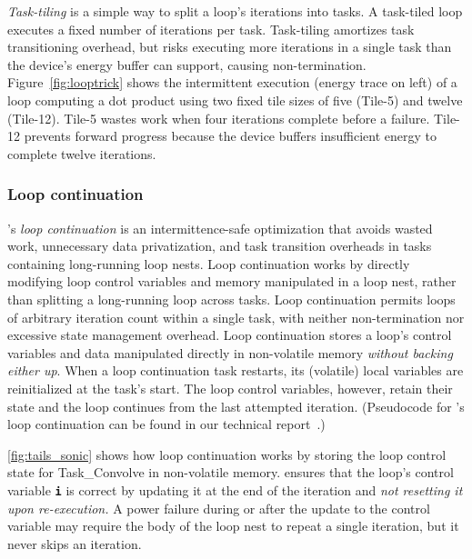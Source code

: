 \figCompDesigns

{\em Task-tiling} is a simple way to split a loop's iterations into tasks.  A
task-tiled loop executes a fixed number of iterations per task.  Task-tiling
amortizes task transitioning overhead, but risks executing more iterations in a
single task than the device's energy buffer can support, causing
non-termination.  Figure~\ref{fig:looptrick} shows the intermittent execution
(energy trace on left) of a loop computing a dot product using two
fixed tile sizes of five (Tile-5) and twelve (Tile-12). Tile-5 wastes work when four
iterations complete before a failure.  Tile-12 prevents forward
progress because the device buffers insufficient energy to complete twelve
iterations.

\subsubsection{Loop continuation}

\sonic's \emph{loop continuation} is an intermittence-safe optimization that avoids wasted work,
unnecessary data privatization, and task transition overheads in tasks
containing long-running loop nests. Loop continuation works by directly
modifying loop control variables and memory manipulated in a loop nest, rather
than splitting a long-running loop across tasks. 
%
Loop continuation
permits loops of arbitrary iteration count within a single task, with neither
non-termination nor excessive state management overhead.
%
Loop continuation stores a loop's control variables and data manipulated directly in non-volatile
memory \emph{without backing either up}.  When a loop continuation task restarts, its
(volatile) local variables are reinitialized at the task's start.  The loop
control variables, however, retain their state and the loop continues from the
last attempted iteration.
(Pseudocode for \sonic's loop continuation can be found in our technical report~\cite{sonic-arxiv}.)

\figLoopContinuation

\autoref{fig:tails_sonic} shows how loop continuation
works by storing the loop control state for \textsf{Task\_Convolve} in non-volatile memory.  
%
\sonic ensures that the loop's control variable {\tt\bfseries i} is correct by updating it at the end of the iteration and \emph{not resetting it upon re-execution.}
A power failure during or after the update to
the control variable may require the body of the loop nest to repeat a single
iteration, but %
it never skips an iteration.

